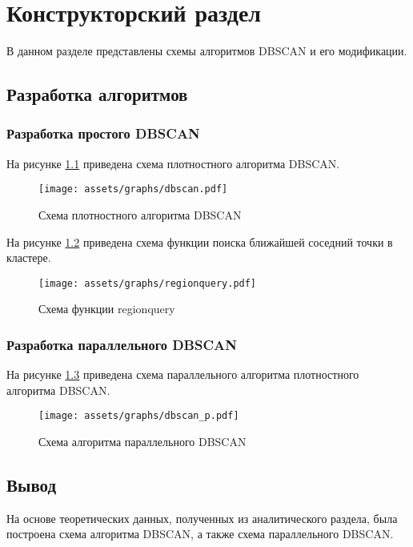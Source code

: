 \chapter{Конструкторский раздел}

В данном разделе представлены схемы алгоритмов DBSCAN и его модификации.

\section{Разработка алгоритмов}

\subsection{Разработка простого DBSCAN}
 
На рисунке \ref{fig:alg} приведена схема плотностного алгоритма DBSCAN.

\begin{figure}[ht!]
	\centering
	\texttt{[image: assets/graphs/dbscan.pdf]}
	\caption{Схема плотностного алгоритма DBSCAN}
	\label{fig:alg}
\end{figure}

На рисунке \ref{fig:alg2} приведена схема функции поиска ближайшей соседний точки в кластере.

\begin{figure}[ht!]
	\centering
	\texttt{[image: assets/graphs/regionquery.pdf]}
	\caption{Схема функции regionquery}
	\label{fig:alg2}
\end{figure}

\subsection{Разработка параллельного DBSCAN}

На рисунке \ref{fig:alg-p} приведена схема параллельного алгоритма плотностного алгоритма DBSCAN.

\begin{figure}[ht!]
	\centering
	\texttt{[image: assets/graphs/dbscan\_p.pdf]}
	\caption{Схема алгоритма параллельного DBSCAN}
	\label{fig:alg-p}
\end{figure}



\section*{Вывод}

На основе теоретических данных, полученных из аналитического раздела, была построена схема алгоритма DBSCAN, а также схема параллельного DBSCAN.